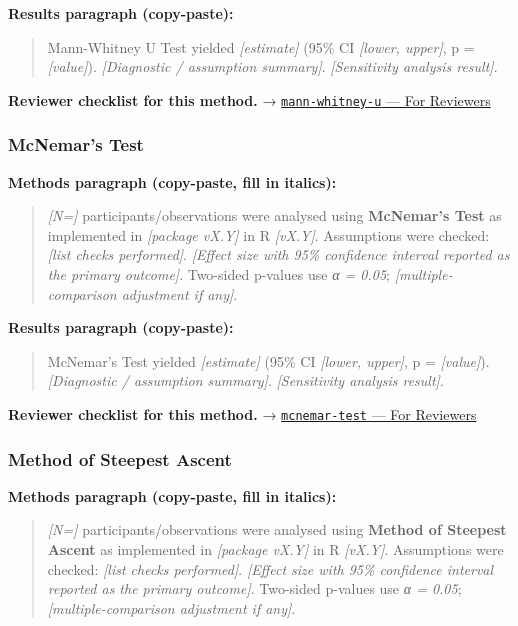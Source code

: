 \documentclass[
]{article}
\begin{document}
\textbf{Results paragraph (copy-paste):}

\begin{quote}
Mann-Whitney U Test yielded \emph{{[}estimate{]}} (95\% CI
\emph{{[}lower, upper{]}}, p = \emph{{[}value{]}}). \emph{{[}Diagnostic
/ assumption summary{]}}. \emph{{[}Sensitivity analysis result{]}}.
\end{quote}

\textbf{Reviewer checklist for this method.} →
\href{../chapters/04-inferential/mann-whitney-u.Rmd\#for-reviewers}{\texttt{mann-whitney-u}
--- For Reviewers}

\subsubsection{McNemar's Test}\label{mcnemars-test}

\textbf{Methods paragraph (copy-paste, fill in italics):}

\begin{quote}
\emph{{[}N={]}} participants/observations were analysed using
\textbf{McNemar's Test} as implemented in \emph{{[}package vX.Y{]}} in R
\emph{{[}vX.Y{]}}. Assumptions were checked: \emph{{[}list checks
performed{]}}. \emph{{[}Effect size with 95\% confidence interval
reported as the primary outcome{]}}. Two-sided p-values use \emph{α =
0.05}; \emph{{[}multiple-comparison adjustment if any{]}}.
\end{quote}

\textbf{Results paragraph (copy-paste):}

\begin{quote}
McNemar's Test yielded \emph{{[}estimate{]}} (95\% CI \emph{{[}lower,
upper{]}}, p = \emph{{[}value{]}}). \emph{{[}Diagnostic / assumption
summary{]}}. \emph{{[}Sensitivity analysis result{]}}.
\end{quote}

\textbf{Reviewer checklist for this method.} →
\href{../chapters/04-inferential/mcnemar-test.Rmd\#for-reviewers}{\texttt{mcnemar-test}
--- For Reviewers}

\subsubsection{Method of Steepest
Ascent}\label{method-of-steepest-ascent}

\textbf{Methods paragraph (copy-paste, fill in italics):}

\begin{quote}
\emph{{[}N={]}} participants/observations were analysed using
\textbf{Method of Steepest Ascent} as implemented in \emph{{[}package
vX.Y{]}} in R \emph{{[}vX.Y{]}}. Assumptions were checked: \emph{{[}list
checks performed{]}}. \emph{{[}Effect size with 95\% confidence interval
reported as the primary outcome{]}}. Two-sided p-values use \emph{α =
0.05}; \emph{{[}multiple-comparison adjustment if any{]}}.
\end{quote}
\end{document}

